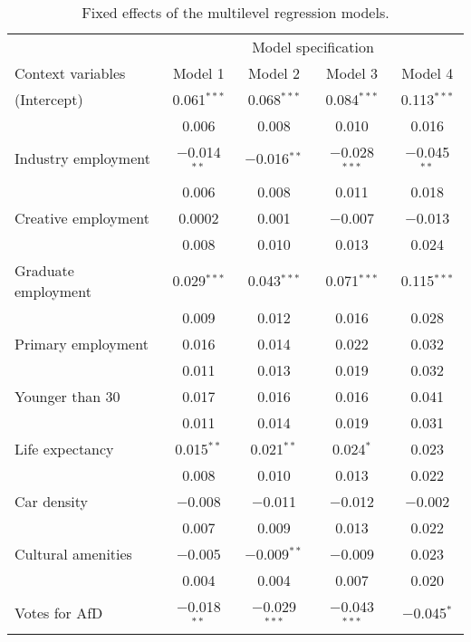 \begin{table}
\caption[Fixed effects of the multilevel regression models]{Fixed effects of the multilevel regression models.}
\label{tab:multilevel}
\centering
\begin{tabular}[t]{lcccc}
\toprule
\multicolumn{1}{c}{ } & \multicolumn{4}{c}{Model specification} \\
\cmidrule(l{3pt}r{3pt}){2-5}
Context variables & Model 1 & Model 2 & Model 3 & Model 4\\
\midrule
(Intercept) & \num{0.061}$^{***}$ & \num{0.068}$^{***}$ & \num{0.084}$^{***}$ & \num{0.113}$^{***}$\\
 & \num{0.006} & \num{0.008} & \num{0.010} & \num{0.016}\\
Industry employment & \num{-0.014}$^{**}$ & \num{-0.016}$^{**}$ & \num{-0.028}$^{***}$ & \num{-0.045}$^{**}$\\
 & \num{0.006} & \num{0.008} & \num{0.011} & \num{0.018}\\
Creative employment & \num{0.0002} & \num{0.001} & \num{-0.007} & \num{-0.013}\\
 & \num{0.008} & \num{0.010} & \num{0.013} & \num{0.024}\\
Graduate employment & \num{0.029}$^{***}$ & \num{0.043}$^{***}$ & \num{0.071}$^{***}$ & \num{0.115}$^{***}$\\
 & \num{0.009} & \num{0.012} & \num{0.016} & \num{0.028}\\
Primary employment & \num{0.016} & \num{0.014} & \num{0.022} & \num{0.032}\\
 & \num{0.011} & \num{0.013} & \num{0.019} & \num{0.032}\\
Younger than 30 & \num{0.017} & \num{0.016} & \num{0.016} & \num{0.041}\\
 & \num{0.011} & \num{0.014} & \num{0.019} & \num{0.031}\\
Life expectancy & \num{0.015}$^{**}$ & \num{0.021}$^{**}$ & \num{0.024}$^{*}$ & \num{0.023}\\
 & \num{0.008} & \num{0.010} & \num{0.013} & \num{0.022}\\
Car density & \num{-0.008} & \num{-0.011} & \num{-0.012} & \num{-0.002}\\
 & \num{0.007} & \num{0.009} & \num{0.013} & \num{0.022}\\
Cultural amenities & \num{-0.005} & \num{-0.009}$^{**}$ & \num{-0.009} & \num{0.023}\\
 & \num{0.004} & \num{0.004} & \num{0.007} & \num{0.020}\\
Votes for AfD & \num{-0.018}$^{**}$ & \num{-0.029}$^{***}$ & \num{-0.043}$^{***}$ & \num{-0.045}$^{*}$\\

\end{tabular}
\end{table}
